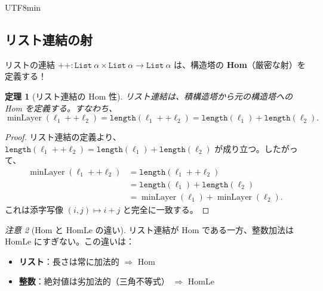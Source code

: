 \documentclass[12pt,a4paper]{article}
\newtheorem{theorem}{定理}[section]
\theoremstyle{definition}
\theoremstyle{remark}
\newtheorem{remark}[theorem]{注意}
\DeclareMathOperator{\minLayer}{minLayer}
\begin{document}
\begin{CJK}{UTF8}{min}
\begin{center}
\end{center}

\subsection{リスト連結の射}

リストの連結 $++: \texttt{List}\ \alpha \times \texttt{List}\ \alpha \to \texttt{List}\ \alpha$ は、構造塔の \textbf{Hom}（厳密な射）を定義する！

\begin{theorem}[リスト連結の Hom 性]
リスト連結は、積構造塔から元の構造塔への Hom を定義する。すなわち、
$$\minLayer(\ell_1 ++ \ell_2) = \texttt{length}(\ell_1 ++ \ell_2) = \texttt{length}(\ell_1) + \texttt{length}(\ell_2).$$
\end{theorem}

\begin{proof}
リスト連結の定義より、$\texttt{length}(\ell_1 ++ \ell_2) = \texttt{length}(\ell_1) + \texttt{length}(\ell_2)$ が成り立つ。したがって、
\begin{align*}
\minLayer(\ell_1 ++ \ell_2) &= \texttt{length}(\ell_1 ++ \ell_2) \\
&= \texttt{length}(\ell_1) + \texttt{length}(\ell_2) \\
&= \minLayer(\ell_1) + \minLayer(\ell_2).
\end{align*}
これは添字写像 $(i, j) \mapsto i + j$ と完全に一致する。
\end{proof}

\begin{remark}[Hom と HomLe の違い]
リスト連結が Hom である一方、整数加法は HomLe にすぎない。この違いは：
\begin{itemize}
\item \textbf{リスト}：長さは常に加法的 $\Rightarrow$ Hom
\item \textbf{整数}：絶対値は劣加法的（三角不等式） $\Rightarrow$ HomLe
\end{itemize}
\end{remark}


\end{CJK}
\end{document}
